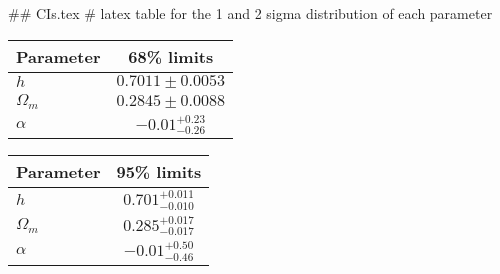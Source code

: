 ## CIs.tex
# latex table for the 1 and 2 sigma distribution of each parameter

\begin{tabular} { l  c}
 Parameter &  68\% limits\\
\hline
{\boldmath$h              $} & $0.7011\pm 0.0053          $\\
{\boldmath$\Omega_m       $} & $0.2845\pm 0.0088          $\\
{\boldmath$\alpha         $} & $-0.01^{+0.23}_{-0.26}     $\\
\hline
\end{tabular}

\begin{tabular} { l  c}
 Parameter &  95\% limits\\
\hline
{\boldmath$h              $} & $0.701^{+0.011}_{-0.010}   $\\
{\boldmath$\Omega_m       $} & $0.285^{+0.017}_{-0.017}   $\\
{\boldmath$\alpha         $} & $-0.01^{+0.50}_{-0.46}     $\\
\hline
\end{tabular}
